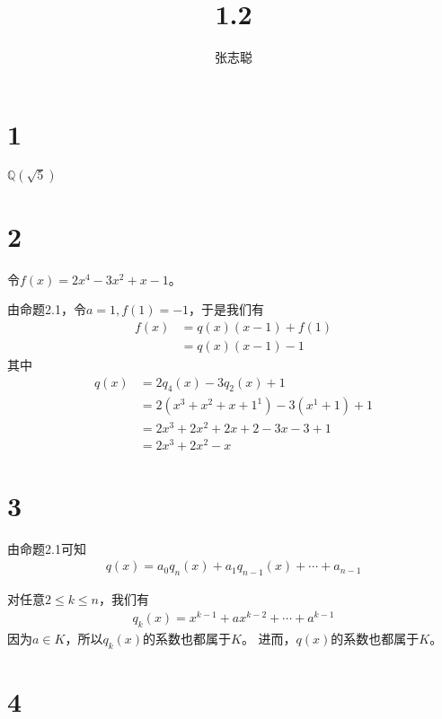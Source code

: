 \documentclass{article}
\begin{document}
\title{1.2}
\author{张志聪}
\maketitle

\section*{1}

$\mathbb{Q}(\sqrt{5})$

\section*{2}

令$f(x) = 2x^4 - 3x^2 + x - 1$。

由命题2.1，令$a = 1, f(1) = -1$，于是我们有
\begin{align*}
  f(x) & = q(x)(x - 1) + f(1) \\
       & = q(x)(x - 1) - 1
\end{align*}
其中
\begin{align*}
  q(x) & = 2 q_4(x) - 3 q_2(x) + 1                 \\
       & = 2(x^3 + x^2 + x + 1^1) - 3(x^1 + 1) + 1 \\
       & = 2x^3 + 2x^2 + 2x + 2 - 3x - 3 + 1       \\
       & = 2x^3 + 2x^2 - x
\end{align*}

\section*{3}

由命题2.1可知
\begin{align*}
  q(x) = a_0q_n(x) + a_1q_{n-1}(x) + \cdots + a_{n - 1}
\end{align*}

对任意$2 \leq k \leq n$，我们有
\begin{align*}
  q_k(x) = x^{k - 1} + ax^{k - 2} + \cdots + a^{k - 1}
\end{align*}
因为$a \in K$，所以$q_k(x)$的系数也都属于$K$。
进而，$q(x)$的系数也都属于$K$。

\section*{4}
\end{document}
